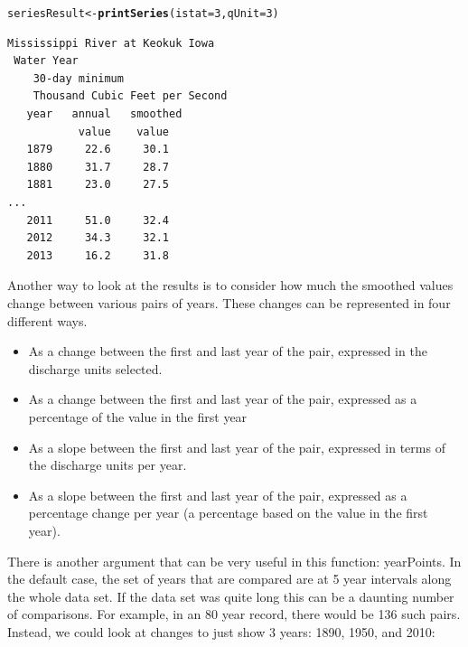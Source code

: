 \documentclass[a4paper,11pt]{article}\usepackage[]{graphicx}\usepackage[]{color}
\makeatletter
\newcommand{\hlnum}[1]{\textcolor[rgb]{0.686,0.059,0.569}{#1}}%
\newcommand{\hlstd}[1]{\textcolor[rgb]{0.345,0.345,0.345}{#1}}%
\newcommand{\hlkwb}[1]{\textcolor[rgb]{0.69,0.353,0.396}{#1}}%
\newcommand{\hlkwc}[1]{\textcolor[rgb]{0.333,0.667,0.333}{#1}}%
\newcommand{\hlkwd}[1]{\textcolor[rgb]{0.737,0.353,0.396}{\textbf{#1}}}%
\newenvironment{kframe}{%
 \def\at@end@of@kframe{}%
 \ifinner\ifhmode%
  \def\at@end@of@kframe{\end{minipage}}%
  \begin{minipage}{\columnwidth}%
 \fi\fi%
 \def\FrameCommand##1{\hskip\@totalleftmargin \hskip-\fboxsep
 \colorbox{shadecolor}{##1}\hskip-\fboxsep
     \hskip-\linewidth \hskip-\@totalleftmargin \hskip\columnwidth}%
 \MakeFramed {\advance\hsize-\width
   \@totalleftmargin\z@ \linewidth\hsize
   \@setminipage}}%
 {\par\unskip\endMakeFramed%
 \at@end@of@kframe}
\newenvironment{knitrout}{}{} %
\makeatother
\begin{document}
\begin{knitrout}
\color{fgcolor}\begin{kframe}
\begin{alltt}
\hlstd{seriesResult} \hlkwb{<-} \hlkwd{printSeries}\hlstd{(}\hlkwc{istat}\hlstd{=}\hlnum{3}\hlstd{,} \hlkwc{qUnit}\hlstd{=}\hlnum{3}\hlstd{)}
\end{alltt}
\end{kframe}
\end{knitrout}


\begin{verbatim}
Mississippi River at Keokuk Iowa
 Water Year
    30-day minimum
    Thousand Cubic Feet per Second
   year   annual   smoothed
           value    value
   1879     22.6     30.1
   1880     31.7     28.7
   1881     23.0     27.5
...
   2011     51.0     32.4
   2012     34.3     32.1
   2013     16.2     31.8
\end{verbatim}

Another way to look at the results is to consider how much the smoothed values change between various pairs of years.  These changes can be represented in four different ways.  
\begin{itemize}
  \item As a change between the first and last year of the pair, expressed in the discharge units selected.
  \item As a change between the first and last year of the pair, expressed as a percentage of the value in the first year
  \item As a slope between the first and last year of the pair, expressed in terms of the discharge units per year.
  \item As a slope between the first and last year of the pair, expressed as a percentage change per year (a percentage based on the value in the first year).
\end{itemize}

There is another argument that can be very useful in this function: yearPoints.  In the default case, the set of years that are compared are at 5 year intervals along the whole data set.  If the data set was quite long this can be a daunting number of comparisons.  For example, in an 80 year record, there would be 136 such pairs. Instead, we could look at changes to just show 3 years: 1890, 1950, and 2010: 
\end{document}
